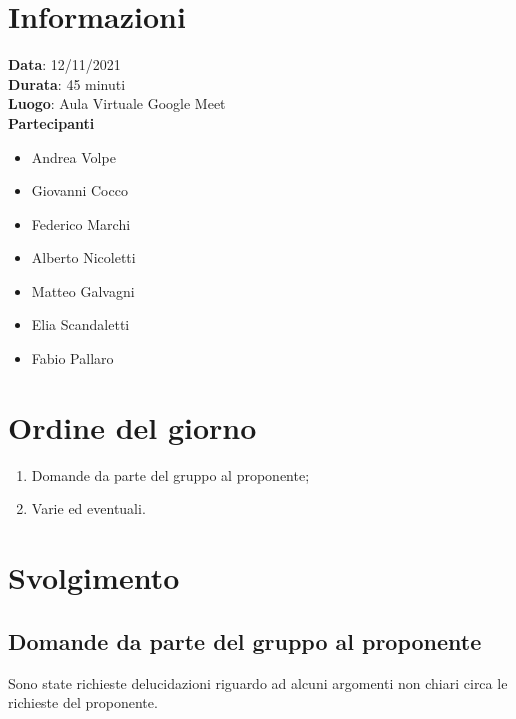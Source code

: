\documentclass[a4paper, 12pt]{article}
\begin{document}
\makefrontpage

\section{Informazioni}
\textbf{Data}: 12/11/2021\\
\textbf{Durata}: 45 minuti\\
\textbf{Luogo}: Aula Virtuale Google Meet\\

\textbf{Partecipanti}
\begin{itemize}
	\item Andrea Volpe
	\item Giovanni Cocco
	\item Federico Marchi
	\item Alberto Nicoletti
	\item Matteo Galvagni
	\item Elia Scandaletti
	\item Fabio Pallaro
\end{itemize}

\section{Ordine del giorno}
\begin{enumerate}
	\item Domande da parte del gruppo al proponente;
	\item Varie ed eventuali.
\end{enumerate}

\section{Svolgimento}

\subsection{Domande da parte del gruppo al proponente}
Sono state richieste delucidazioni riguardo ad alcuni argomenti non chiari circa le richieste del proponente.
\end{document}
